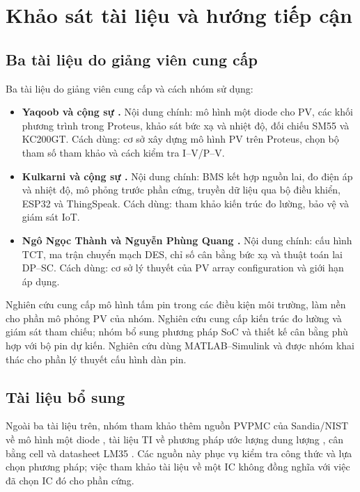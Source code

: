 \section{Khảo sát tài liệu và hướng tiếp cận}

\subsection{Ba tài liệu do giảng viên cung cấp}

Ba tài liệu do giảng viên cung cấp và cách nhóm sử dụng:

\begin{itemize}
    \item \textbf{Yaqoob và cộng sự \cite{yaqoob}.} Nội dung chính: mô hình một diode cho PV, các khối phương trình trong Proteus, khảo sát bức xạ và nhiệt độ, đối chiếu SM55 và KC200GT. Cách dùng: cơ sở xây dựng mô hình PV trên Proteus, chọn bộ tham số tham khảo và cách kiểm tra I--V/P--V.
    \item \textbf{Kulkarni và cộng sự \cite{kulkarni}.} Nội dung chính: BMS kết hợp nguồn lai, đo điện áp và nhiệt độ, mô phỏng trước phần cứng, truyền dữ liệu qua bộ điều khiển, ESP32 và ThingSpeak. Cách dùng: tham khảo kiến trúc đo lường, bảo vệ và giám sát IoT.
    \item \textbf{Ngô Ngọc Thành và Nguyễn Phùng Quang \cite{thanh}.} Nội dung chính: cấu hình TCT, ma trận chuyển mạch DES, chỉ số cân bằng bức xạ và thuật toán lai DP--SC. Cách dùng: cơ sở lý thuyết của PV array configuration và giới hạn áp dụng.
\end{itemize}

Nghiên cứu \cite{yaqoob} cung cấp mô hình tấm pin trong các điều kiện môi trường, làm nền cho phần mô phỏng PV của nhóm. Nghiên cứu \cite{kulkarni} cung cấp kiến trúc đo lường và giám sát tham chiếu; nhóm bổ sung phương pháp SoC và thiết kế cân bằng phù hợp với bộ pin dự kiến. Nghiên cứu \cite{thanh} dùng MATLAB--Simulink và được nhóm khai thác cho phần lý thuyết cấu hình dàn pin.

\subsection{Tài liệu bổ sung}

Ngoài ba tài liệu trên, nhóm tham khảo thêm nguồn PVPMC của Sandia/NIST về mô hình một diode \cite{pvpmc}, tài liệu TI về phương pháp ước lượng dung lượng \cite{tigauge}, cân bằng cell \cite{tibalance} và datasheet LM35 \cite{lm35}. Các nguồn này phục vụ kiểm tra công thức và lựa chọn phương pháp; việc tham khảo tài liệu về một IC không đồng nghĩa với việc đã chọn IC đó cho phần cứng.

